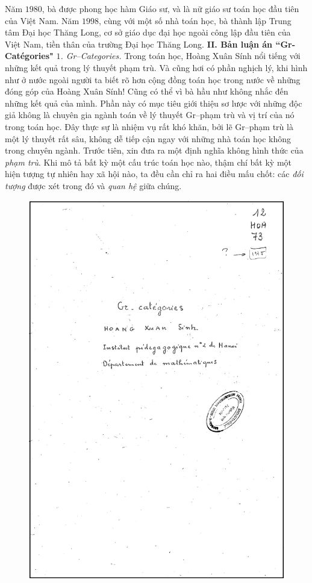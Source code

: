 \begin{multicols}{2}
\begin{figure}[H]
		\vspace*{-15pt}
	\end{figure}
	Năm $1980$, bà được phong học hàm Giáo sư, và là nữ giáo sư toán học đầu tiên của Việt Nam.
	\vskip 0.1cm
	Năm $1998$, cùng với một số nhà toán học, bà thành lập Trung tâm Đại học Thăng Long, cơ sở giáo dục đại học ngoài công lập đầu tiên của Việt Nam, tiền thân của trường Đại học Thăng Long. 
	\vskip 0.1cm
	\textbf{\color{doisongtoanhoc}II. Bản luận án ``Gr-Catégories" }
	\vskip 0.1cm
	\textit{$1$. Gr--Categories.}
	\vskip 0.1cm
	Trong toán học, Hoàng Xuân Sính nổi tiếng với những kết quả trong lý thuyết phạm trù. Và cũng hơi có phần nghịch lý, khi hình như ở nước ngoài người ta biết rõ hơn cộng đồng toán học trong nước về những đóng góp của Hoàng Xuân Sính! Cũng có thể vì bà hầu như không nhắc đến những kết quả của mình.
	\vskip 0.1cm
	Phần này có mục tiêu giới thiệu sơ lược với những độc giả không là chuyên gia ngành toán về lý thuyết Gr--phạm trù và vị trí của nó trong toán học. Đây thực sự là nhiệm vụ rất khó khăn, bởi lẽ Gr--phạm trù là một lý thuyết rất sâu, không dễ tiếp cận ngay với những nhà toán học không trong chuyên ngành.  
	\vskip 0.1cm
	Trước tiên, xin đưa ra một định nghĩa không hình thức của \textit{phạm trù}.
	Khi mô tả bất kỳ một cấu trúc toán học nào, thậm chí bất kỳ một hiện tượng tự nhiên hay xã hội nào, ta đều cần chỉ ra hai điều mấu chốt: các \textit{đối tượng} được xét trong đó và \textit{quan hệ} giữa chúng.  
	\begin{figure}[H]
		\vspace*{-5pt}
		\centering
		\captionsetup{labelformat= empty, justification=centering}
		\includegraphics[height= 0.72\linewidth]{Anh21}

\end{figure}
\end{multicols}

